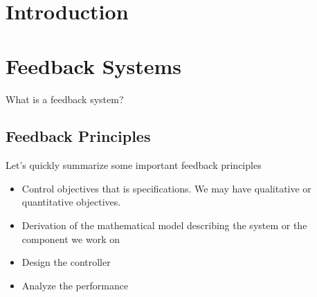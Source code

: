 \section{Introduction}
\label{introduction}


\section{Feedback Systems}
What is a feedback system?


\subsection{Feedback Principles}
Let's quickly summarize some important feedback principles


\begin{itemize}
\item Control objectives that is specifications. We may have qualitative or quantitative objectives.
\item Derivation of the mathematical model describing the system or the component we work on
\item Design the controller
\item Analyze the performance
\end{itemize}



